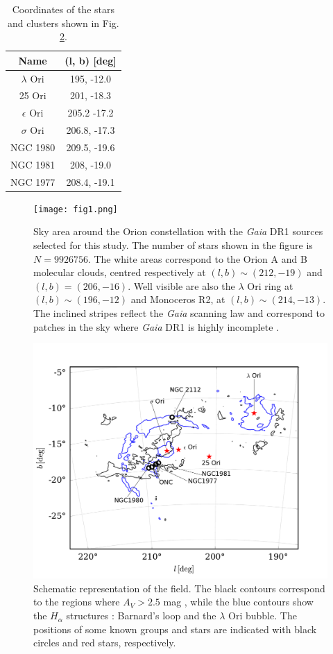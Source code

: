 \documentclass[twocolumn]{aa}
\begin{document}
\begin{table}
\caption{Coordinates of the stars and clusters shown in Fig. \ref{fig:2}.}
\begin{tabular}{cc}
\hline
Name & (l, b) [deg] \\
\hline
\hline
$\lambda$ Ori  &  195, -12.0 \\
25 Ori & 201, -18.3 \\
$\epsilon$ Ori  &  205.2 -17.2 \\
$\sigma$ Ori & 206.8, -17.3 \\
NGC 1980  &  209.5, -19.6 \\
NGC 1981 &   208, -19.0 \\
NGC 1977  &  208.4, -19.1
\end{tabular}
\label{table:1}
\end{table}

\begin{figure}
\centering
\texttt{[image: fig1.png]}%
\caption{Sky area around the Orion constellation with the \textit{Gaia} DR1 sources selected for this study. The number of stars shown in the figure is $N = 9 926 756$. The white areas correspond to the Orion A and B molecular clouds, centred respectively at $(l, b) \sim (212, -19)$ and $(l, b) = (206, -16)$. Well visible are also the $\lambda$ Ori ring at $(l, b) \sim (196, -12)$ and Monoceros R2, at $(l, b) \sim (214, -13)$. The inclined stripes reflect the \textit{Gaia} scanning law and correspond to patches in the sky where \textit{Gaia} DR1 is highly incomplete \citep[see][]{Brown2016}.
}
\label{fig:1}
\end{figure}
\begin{figure}
\includegraphics[width = \hsize]{fig2.pdf}
\caption{Schematic representation of the field. The black contours correspond to the regions where $A_V > 2.5$ mag \citep{Planck2014}, while the blue contours show the $H_{\alpha}$ structures \citep{Finkbeiner2003}: Barnard's loop and the $\lambda$ Ori bubble. The positions of some known groups and stars are indicated with black circles and red stars, respectively.}
\label{fig:2}
\end{figure}
\end{document}
